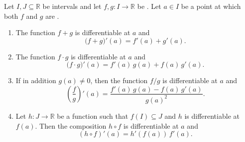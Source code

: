 \begin{proposition} \label{proposition:sum_rule_product_rule_quotient_rule_chain_rule_for_real_derivatives_of_real_valued_functions_on_real_intervals}
    Let $I, J \subseteq \mathbb{R}$ be intervals and let $f, g : I \to \mathbb{R}$ be . Let $a \in I$ be a point at which both $f$ and $g$ are .

    \begin{enumerate}
        \item[\textbf{(Sum rule)}] The function $f + g$ is differentiable at $a$ and
        $$\bigl(f + g\bigr)'(a) = f'(a) + g'(a).$$

        \item[\textbf{(Product rule)}] The function $f \cdot g$ is differentiable at $a$ and
        $$\bigl(f \cdot g\bigr)'(a) = f'(a)\,g(a) + f(a)\,g'(a).$$

        \item[\textbf{(Quotient rule)}] If in addition $g(a) \neq 0$, then the function $f/g$ is differentiable at $a$ and
        $$\left(\frac{f}{g}\right)'(a) = \frac{f'(a)\,g(a) - f(a)\,g'(a)}{g(a)^2}.$$

        \item[\textbf{(Chain rule)}] Let $h : J \to \mathbb{R}$ be a function such that $f(I) \subseteq J$ and $h$ is differentiable at $f(a)$. Then the composition $h \circ f$ is differentiable at $a$ and
        $$(h \circ f)'(a) = h'(f(a))\,f'(a).$$
    \end{enumerate}
\end{proposition}
